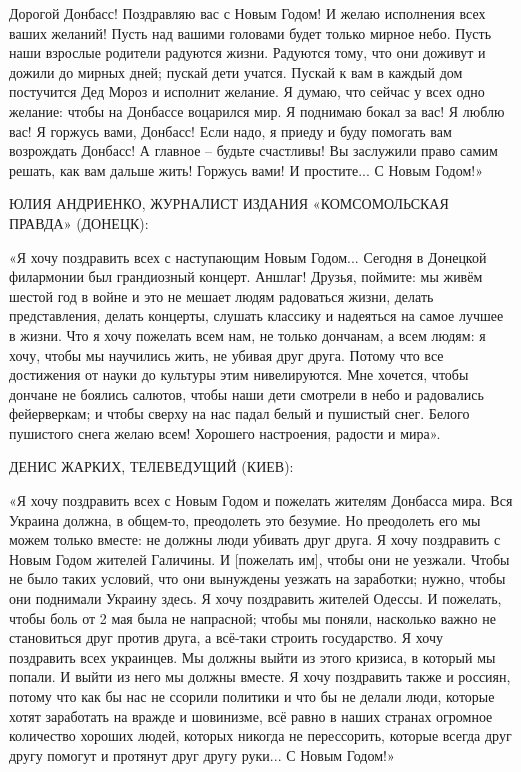 Дорогой Донбасс! Поздравляю вас с Новым Годом! И желаю исполнения всех ваших
желаний! Пусть над вашими головами будет только мирное небо. Пусть наши
взрослые родители радуются жизни. Радуются тому, что они доживут и дожили до
мирных дней; пускай дети учатся. Пускай к вам в каждый дом постучится Дед Мороз
и исполнит желание. Я думаю, что сейчас у всех одно желание: чтобы на Донбассе
воцарился мир. Я поднимаю бокал за вас! Я люблю вас! Я горжусь вами, Донбасс!
Если надо, я приеду и буду помогать вам возрождать Донбасс! А главное – будьте
счастливы! Вы заслужили право самим решать, как вам дальше жить! Горжусь вами!
И простите... С Новым Годом!»

ЮЛИЯ АНДРИЕНКО, ЖУРНАЛИСТ ИЗДАНИЯ «КОМСОМОЛЬСКАЯ ПРАВДА» (ДОНЕЦК):

«Я хочу поздравить всех с наступающим Новым Годом... Сегодня в Донецкой
филармонии был грандиозный концерт. Аншлаг! Друзья, поймите: мы живём шестой
год в войне и это не мешает людям радоваться жизни, делать представления,
делать концерты, слушать классику и надеяться на самое лучшее в жизни. Что я
хочу пожелать всем нам, не только дончанам, а всем людям: я хочу, чтобы мы
научились жить, не убивая друг друга. Потому что все достижения от науки до
культуры этим нивелируются. Мне хочется, чтобы дончане не боялись салютов,
чтобы наши дети смотрели в небо и радовались фейерверкам; и чтобы сверху на нас
падал белый и пушистый снег. Белого пушистого снега желаю всем! Хорошего
настроения, радости и мира».

ДЕНИС ЖАРКИХ, ТЕЛЕВЕДУЩИЙ (КИЕВ):

«Я хочу поздравить всех с Новым Годом и пожелать жителям Донбасса мира. Вся
Украина должна, в общем-то, преодолеть это безумие. Но преодолеть его мы можем
только вместе: не должны люди убивать друг друга. Я хочу поздравить с Новым
Годом жителей Галичины. И [пожелать им], чтобы они не уезжали. Чтобы не было
таких условий, что они вынуждены уезжать на заработки; нужно, чтобы они
поднимали Украину здесь. Я хочу поздравить жителей Одессы. И пожелать, чтобы
боль от 2 мая была не напрасной; чтобы мы поняли, насколько важно не
становиться друг против друга, а всё-таки строить государство. Я хочу
поздравить всех украинцев. Мы должны выйти из этого кризиса, в который мы
попали. И выйти из него мы должны вместе. Я хочу поздравить также и россиян,
потому что как бы нас не ссорили политики и что бы не делали люди, которые
хотят заработать на вражде и шовинизме, всё равно в наших странах огромное
количество хороших людей, которых никогда не перессорить, которые всегда друг
другу помогут и протянут друг другу руки... С Новым Годом!»

